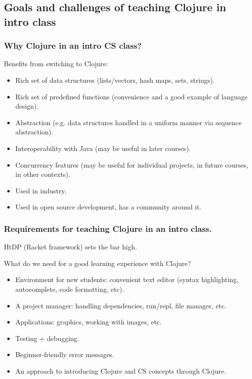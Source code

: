 \documentclass{beamer}
\begin{document}
\subsection{Goals and challenges of teaching Clojure in intro class}

\begin{frame}
  \frametitle{Why Clojure in an intro CS class?}
Benefits from switching to Clojure:
\begin{itemize}
\item Rich set of data structures (lists/vectors, hash maps, sets, strings).
\item Rich set of predefined functions (convenience and a good example of language design). 
\item Abstraction (e.g. data structures handled in a uniform manner via sequence abstraction). 
\item Interoperability with Java (may be useful in later courses).
\item Concurrency features (may be useful for individual projects, in future courses, in other contexts). 
\item Used in industry.
\item Used in open source development, has a community around it. 
\end{itemize}
\end{frame}


\begin{frame}
  \frametitle{Requirements for teaching Clojure in an intro class.}
HtDP (Racket framework) sets the bar high.

What do we need for a good learning experience with Clojure?
\begin{itemize}
\item Environment for new students: convenient text editor (syntax highlighting, autocomplete, code formatting, etc).
\item A project manager: handling dependencies, run/repl, file manager, etc. 
\item Applications: graphics, working with images, etc. 
\item Testing + debugging. 
\item Beginner-friendly error messages. 
\item An approach to introducing Clojure and CS concepts through Clojure. 
\end{itemize}
\end{frame}
\end{document}
